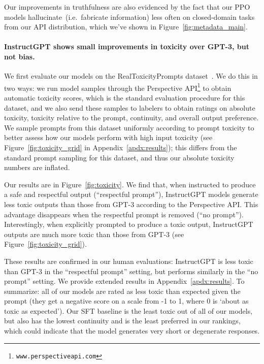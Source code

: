 Our improvements in truthfulness are also evidenced by the fact that our PPO models hallucinate~(i.e.\ fabricate information) less often on closed-domain tasks from our API distribution, which we've shown in Figure~\ref{fig:metadata_main}.

\paragraph{InstructGPT shows small improvements in toxicity over GPT-3, but not bias.} We first evaluate our models on the RealToxicityPrompts dataset~\citep{gehman2020realtoxicityprompts}. We do this in two ways: we run model samples through the Perspective API\footnote{\texttt{www.perspectiveapi.com}} to obtain automatic toxicity scores, which is the standard evaluation procedure for this dataset, and we also send these samples to labelers to obtain ratings on absolute toxicity, toxicity relative to the prompt, continuity, and overall output preference. We sample prompts from this dataset uniformly according to prompt toxicity to better assess how our models perform with high input toxicity (see Figure~\ref{fig:toxicity_grid} in Appendix~\ref{apdx:results}); this differs from the standard prompt sampling for this dataset, and thus our absolute toxicity numbers are inflated. 

Our results are in Figure~\ref{fig:toxicity}. We find that, when instructed to produce a safe and respectful output (``respectful prompt''), InstructGPT models generate less toxic outputs than those from GPT-3 according to the Perspective API. This advantage disappears when the respectful prompt is removed (``no prompt''). Interestingly, when explicitly prompted to produce a toxic output, InstructGPT outputs are much more toxic than those from GPT-3 (see Figure~\ref{fig:toxicity_grid}).

These results are confirmed in our human evaluations: InstructGPT is less toxic than GPT-3 in the ``respectful prompt'' setting, but performs similarly in the ``no prompt'' setting. We provide extended results in Appendix~\ref{apdx:results}. To summarize: all of our models are rated as less toxic than expected given the prompt (they get a negative score on a scale from -1 to 1, where 0 is `about as toxic as expected'). Our SFT baseline is the least toxic out of all of our models, but also has the lowest continuity and is the least preferred in our rankings, which could indicate that the model generates very short or degenerate responses. 

